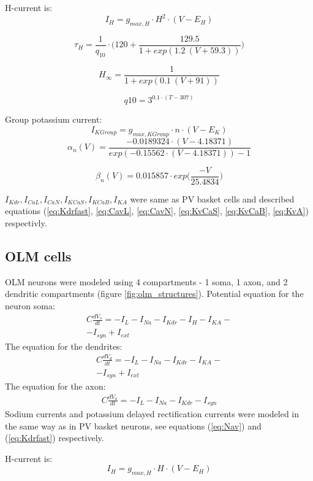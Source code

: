 \documentclass[a4paper,12pt]{article}
\begin{document}
H-current is:
\begin{equation}
\label{eq:HCN}
I_{H} = g_{max, H} \cdot H^2 \cdot (V - E_{H})
\end{equation}

\begin{equation}
\tau_{H} = \frac{1}{q_{10}} \cdot \Bigg(120 + \frac{129.5}{1 + exp(1.2 \ (V + 59.3))} \Bigg)
\end{equation}

\begin{equation}
H_{\infty} =  \frac{1}{1 + exp(0.1 \ (V + 91))}
\end{equation}

\begin{equation}
q10 = 3^{0.1\cdot (T - 307) } 
\end{equation}

Group potassium current:
\begin{equation}
\label{eq:KvGroup}
I_{KGroup} = g_{max, KGroup} \cdot n \cdot (V - E_K)
\end{equation}
\begin{equation}
\alpha_n(V) = \frac{-0.0189324 \cdot (V - 4.18371) }{exp(-0.15562\cdot (V - 4.18371)) - 1}
\end{equation}

\begin{equation}
\beta_n(V) = 0.015857 \cdot exp \Big(\frac{-V}{25.4834}\Big)
\end{equation}


$ I_{Kdr}, I_{CaL}, I_{CaN},I_{KCaS}, I_{KCaB}, I_{KA}$ were same as PV basket cells and described equations (\ref{eq:Kdrfast}, \ref{eq:CavL}, \ref{eq:CavN}, \ref{eq:KvCaS}, \ref{eq:KvCaB}, \ref{eq:KvA}) respectivly.

\subsection{OLM cells}
OLM neurons were modeled using 4 compartments - 1 soma, 1 axon, and 2 dendritic compartments (figure \ref{fig:olm_structures}). Potential equation for the neuron soma:
\begin{eqnarray}
C\frac{dV_s}{dt} = -I_L - I_{Na} - I_{Kdr} - I_{H} - I_{KA}-
 \nonumber \\
-I_{syn} + I_{ext}
\end{eqnarray}
The equation for the dendrites:
\begin{eqnarray}
C\frac{dV_d}{dt} = -I_L - I_{Na} - I_{Kdr} - I_{KA}-
\nonumber \\
-I_{syn} + I_{ext}
\end{eqnarray}
The equation for the axon:
\begin{eqnarray}
C\frac{dV_a}{dt} = -I_L - I_{Na} - I_{Kdr} - I_{syn}
\end{eqnarray}
Sodium currents and potassium delayed rectification currents were modeled in the same way as in PV basket neurons, see equations (\ref{eq:Nav}) and (\ref{eq:Kdrfast}) respectively. \par
H-current is:
\begin{equation}
\label{eq:HCNolm}
I_{H} = g_{max, H} \cdot H \cdot (V - E_{H})
\end{equation}
\end{document}
